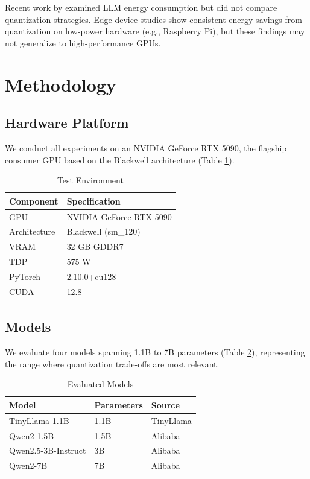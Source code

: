 \documentclass[11pt]{article}
\begin{document}
Recent work by \cite{samsi2023words} examined LLM energy consumption but did not compare quantization strategies. Edge device studies \cite{xu2024quantization} show consistent energy savings from quantization on low-power hardware (e.g., Raspberry Pi), but these findings may not generalize to high-performance GPUs.

\section{Methodology}

\subsection{Hardware Platform}

We conduct all experiments on an NVIDIA GeForce RTX 5090, the flagship consumer GPU based on the Blackwell architecture (Table \ref{tab:hardware}).

\begin{table}[h]
\centering
\caption{Test Environment}
\label{tab:hardware}
\begin{tabular}{ll}
\toprule
\textbf{Component} & \textbf{Specification} \\
\midrule
GPU & NVIDIA GeForce RTX 5090 \\
Architecture & Blackwell (sm\_120) \\
VRAM & 32 GB GDDR7 \\
TDP & 575 W \\
PyTorch & 2.10.0+cu128 \\
CUDA & 12.8 \\
\bottomrule
\end{tabular}
\end{table}

\subsection{Models}

We evaluate four models spanning 1.1B to 7B parameters (Table \ref{tab:models}), representing the range where quantization trade-offs are most relevant.

\begin{table}[h]
\centering
\caption{Evaluated Models}
\label{tab:models}
\begin{tabular}{lll}
\toprule
\textbf{Model} & \textbf{Parameters} & \textbf{Source} \\
\midrule
TinyLlama-1.1B & 1.1B & TinyLlama \\
Qwen2-1.5B & 1.5B & Alibaba \\
Qwen2.5-3B-Instruct & 3B & Alibaba \\
Qwen2-7B & 7B & Alibaba \\
\bottomrule
\end{tabular}
\end{table}
\end{document}
